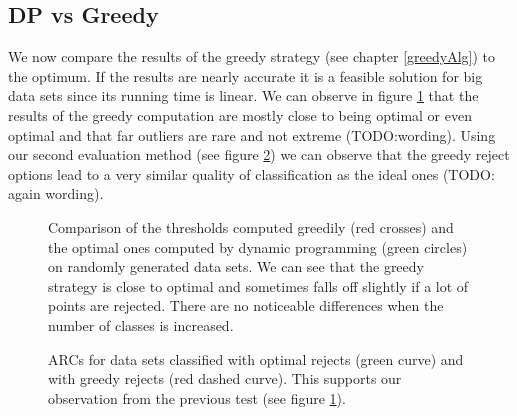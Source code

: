 \subsection{DP vs Greedy}
\label{DPvsGR}
We now compare the results of the greedy strategy (see chapter \ref{greedyAlg}) to the optimum. If the results are nearly accurate it is a feasible solution for big data sets since its running time is linear. We can observe in figure \ref{greedyEvaPareto} that the results of the greedy computation are mostly close to being optimal or even optimal and that far outliers are rare and not extreme (TODO:wording). Using our second evaluation method (see figure \ref{greedyEvaARC}) we can observe that the greedy reject options lead to a very similar quality of classification as the ideal ones (TODO: again wording).

\begin{figure}[!htbp]
\centering
\caption{Comparison of the thresholds computed greedily (red crosses) and the optimal ones computed by dynamic programming (green circles) on randomly generated data sets. We can see that the greedy strategy is close to optimal and sometimes falls off slightly if a lot of points are rejected. There are no noticeable differences when the number of classes is increased.}
\label{greedyEvaPareto}
\end{figure}


\begin{figure}[!htbp]
\centering
\caption{ARCs for data sets classified with optimal rejects (green curve) and with greedy rejects (red dashed curve). This supports our observation from the previous test (see figure \ref{greedyEvaPareto}).}
\label{greedyEvaARC}
\end{figure}
